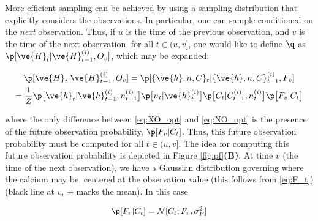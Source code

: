 %

More efficient sampling can be achieved by using a sampling distribution that explicitly considers the observations.  In particular, one can sample conditioned on the \emph{next} observation.  Thus, if $u$ is the time of the previous observation, and $v$ is the time of the next observation, for all $t \in(u,v]$, one would like to define $\q$ as $\p[\ve{H}_t|\ve{H}_{t-1}^{(i)},O_v]$, which may be expanded:

\begin{multline} \label{aeq:XO_opt}
\p[\ve{H}_t|\ve{H}_{t-1}^{(i)},O_v] = \p [\{\ve{h},n,C\}_t | \{\ve{h},n,C\}_{t-1}^{(i)}, F_v]
\\ = \frac{1}{Z} \p \big[ \ve{h}_t | \ve{h}^{(i)}_{t-1}, n_{t-1}^{(i)} \big] \p \big[ n_t | \ve{h}^{(i)}_{t} \big] \p \big[ C_t | C^{(i)}_{t-1}, n_t^{(i)} \big] \p \big[ F_v | C_t \big]
\end{multline}

\noindent where the only difference between \eqref{eq:XO_opt} and \eqref{eq:NO_opt} is the presence of the future observation probability,  $\p[F_v | C_t]$.  Thus, this future observation probability must be computed for all $t \in(u,v]$.  The idea for computing this future observation probability is depicted in Figure \ref{fig:pf}\textbf{(B)}.  At time $v$ (the time of the next observation), we have a Gaussian distribution governing where the calcium may be, centered at the observation value (this follows from \eqref{eq:F_t}) (black line at $v$, $+$ marks the mean). In this case

\begin{align}
\p[F_v | C_t] = \mathcal{N}[C_t; F_v, \sigma_F^2]
\end{align}

